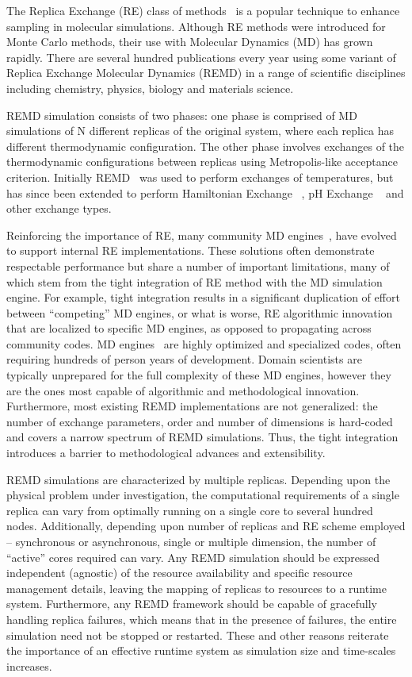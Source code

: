 \documentclass{sig-alternate-05-2015}
\begin{document}
The Replica Exchange (RE) class of methods~\cite{swendsen1986replica} is a popular technique to enhance sampling in molecular simulations.  Although RE methods were introduced for Monte Carlo methods, their use with Molecular Dynamics (MD) has grown rapidly. There are several hundred publications every year using some variant of Replica Exchange Molecular Dynamics (REMD) in a range of scientific disciplines including chemistry, physics, biology and materials science.

REMD simulation consists of two phases: one phase is comprised of MD simulations of N different replicas of the original system, where each replica has different thermodynamic configuration.  The other phase involves exchanges of the thermodynamic configurations between replicas using Metropolis-like acceptance criterion.  Initially REMD~\cite{sugita1999replica} was used to perform exchanges of temperatures, but has since been extended to perform Hamiltonian Exchange ~\cite{fukunishi2002hamiltonian}, pH Exchange ~\cite{meng2010constant} and other exchange types.
 
Reinforcing the importance of RE, many community MD engines~\cite{Amber, namd2005, gromacs1995}, have evolved to support internal RE implementations. These solutions often demonstrate respectable performance but share a number of important limitations, many of which stem from the tight integration of RE method with the MD simulation engine.  For example, tight integration results in a significant duplication of effort between ``competing'' MD engines, or what is worse, RE algorithmic innovation that are localized to specific MD engines, as opposed to propagating across community codes.  MD engines~\cite{Amber, namd2005, gromacs1995} are highly optimized and specialized codes, often requiring hundreds of person years of development. Domain scientists are typically unprepared for the full complexity of these MD engines, however they are the ones most capable of algorithmic and methodological innovation.  Furthermore, most existing REMD implementations are not generalized: the number of exchange parameters, order and number of dimensions is hard-coded and covers a narrow spectrum of REMD simulations. Thus, the tight integration introduces a barrier to methodological advances and extensibility.

REMD simulations are characterized by multiple replicas. Depending upon the physical problem under investigation, the computational requirements of a single replica can vary from optimally running on a single core to several hundred nodes.  Additionally, depending upon number of replicas and RE scheme employed -- synchronous or asynchronous, single or multiple dimension, the number of ``active'' cores required can vary. Any REMD simulation should be expressed independent (agnostic) of the resource availability and specific resource management details, leaving the mapping of replicas to resources to a runtime system. Furthermore, any REMD framework should be capable of gracefully handling replica failures, which means that in the presence of failures, the entire simulation need not be stopped or restarted. These and other reasons reiterate the importance of an effective runtime system as simulation size and time-scales increases.
\end{document}
